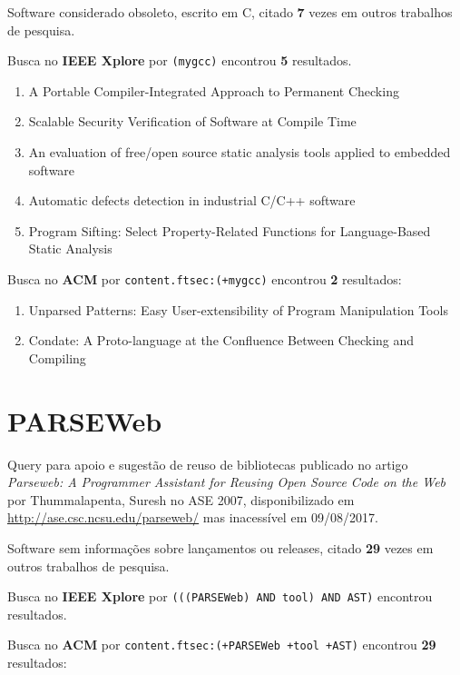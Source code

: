 Software considerado obsoleto,
escrito em C,
citado {\bf 7} vezes em outros trabalhos de pesquisa.

Busca no {\bf IEEE Xplore} por
\texttt{(mygcc)}
encontrou {\bf 5}
resultados.

\begin{enumerate}
\item A Portable Compiler-Integrated Approach to Permanent Checking
\item Scalable Security Verification of Software at Compile Time
\item An evaluation of free/open source static analysis tools applied to embedded software
\item Automatic defects detection in industrial C/C++ software
\item Program Sifting: Select Property-Related Functions for Language-Based Static Analysis
\end{enumerate}

Busca no {\bf ACM} por
\texttt{content.ftsec:(+mygcc)}
encontrou {\bf 2}
resultados:

\begin{enumerate}
\item Unparsed Patterns: Easy User-extensibility of Program Manipulation Tools
\item Condate: A Proto-language at the Confluence Between Checking and Compiling
\end{enumerate}

\section{PARSEWeb}

Query para apoio e sugestão de reuso de bibliotecas
publicado no artigo {\it Parseweb: A Programmer Assistant for Reusing Open Source Code on the Web}
por Thummalapenta, Suresh
no ASE 2007,
disponibilizado em \url{http://ase.csc.ncsu.edu/parseweb/}
mas inacessível em 09/08/2017.

Software sem informações sobre lançamentos ou releases,
citado {\bf 29} vezes em outros trabalhos de pesquisa.

Busca no {\bf IEEE Xplore} por
\texttt{(((PARSEWeb) AND tool) AND AST)}
encontrou {\bf }
resultados.


Busca no {\bf ACM} por
\texttt{content.ftsec:(+PARSEWeb +tool +AST)}
encontrou {\bf 29}
resultados:

